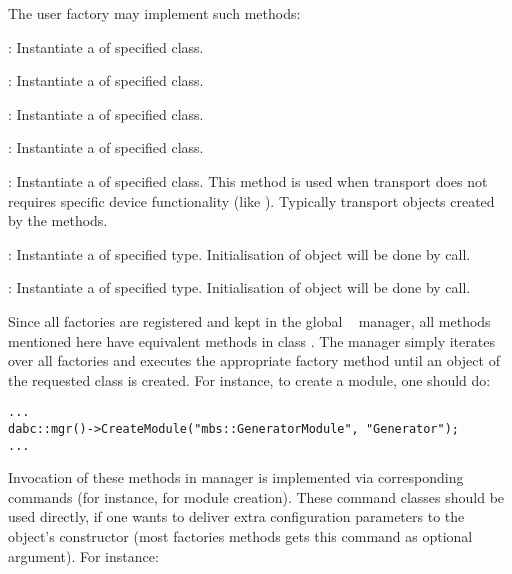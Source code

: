 The user factory may implement such methods:
\bdes
	\item [\func{CreateModule()}] : 
	Instantiate a  of specified class. 
	
\item [\func{CreateDevice()}] : 
	Instantiate a  of specified class. 

\item [\func{CreateThread()}] : 
   Instantiate a  of specified class.
	
\item [\func{CreateApplication()}] : 
	Instantiate a  of specified class.

\item [\func{CreateTransport()}] : 
   Instantiate a  of specified class.
   This method is used when transport does not requires specific device functionality
   (like ). Typically transport objects
   created by the  methods.   
	
\item [\func{CreateDataInput()}] : 
   Instantiate a  of specified type.
   Initialisation of object will be done by  call.

\item [\func{CreateDataOutput()}] : 
   Instantiate a  of specified type.
   Initialisation of object will be done by  call.
	
\edes      

Since all factories are registered and kept in the global \dabc~ manager, 
all methods mentioned here  have equivalent methods in class .
The manager simply iterates over all factories and executes the appropriate factory method
until an object of the requested class is created. For instance, to create a module, one should do:

\begin{small}
\begin{verbatim}
...
dabc::mgr()->CreateModule("mbs::GeneratorModule", "Generator");
...
\end{verbatim}     
\end{small}

Invocation of these methods in manager is implemented via corresponding commands
(for instance,  for module creation). 
These command classes should be used directly, if one wants to deliver extra 
configuration parameters to the object's constructor (most factories methods gets
this command as optional argument). For instance:

